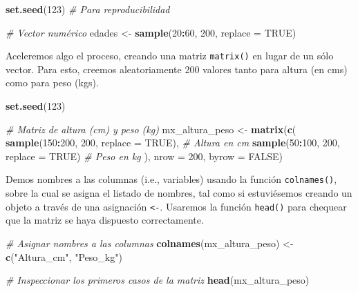 \documentclass[
]{book}
\newenvironment{Shaded}{\begin{snugshade}}{\end{snugshade}}
\newcommand{\AttributeTok}[1]{\textcolor[rgb]{0.13,0.29,0.53}{#1}}
\newcommand{\CommentTok}[1]{\textcolor[rgb]{0.56,0.35,0.01}{\textit{#1}}}
\newcommand{\ConstantTok}[1]{\textcolor[rgb]{0.56,0.35,0.01}{#1}}
\newcommand{\DecValTok}[1]{\textcolor[rgb]{0.00,0.00,0.81}{#1}}
\newcommand{\FunctionTok}[1]{\textcolor[rgb]{0.13,0.29,0.53}{\textbf{#1}}}
\newcommand{\NormalTok}[1]{#1}
\newcommand{\OtherTok}[1]{\textcolor[rgb]{0.56,0.35,0.01}{#1}}
\newcommand{\SpecialCharTok}[1]{\textcolor[rgb]{0.81,0.36,0.00}{\textbf{#1}}}
\newcommand{\StringTok}[1]{\textcolor[rgb]{0.31,0.60,0.02}{#1}}
\begin{document}
\begin{Shaded}
\begin{Highlighting}[]
\FunctionTok{set.seed}\NormalTok{(}\DecValTok{123}\NormalTok{)  }\CommentTok{\# Para reproducibilidad}

\CommentTok{\# Vector numérico}
\NormalTok{edades }\OtherTok{\textless{}{-}} \FunctionTok{sample}\NormalTok{(}\DecValTok{20}\SpecialCharTok{:}\DecValTok{60}\NormalTok{, }\DecValTok{200}\NormalTok{, }\AttributeTok{replace =} \ConstantTok{TRUE}\NormalTok{)}
\end{Highlighting}
\end{Shaded}

Aceleremos algo el proceso, creando una matriz \texttt{matrix()} en lugar de un sólo vector. Para esto, creemos aleatoriamente 200 valores tanto para altura (en cms) como para peso (kgs).

\begin{Shaded}
\begin{Highlighting}[]
\FunctionTok{set.seed}\NormalTok{(}\DecValTok{123}\NormalTok{)}

\CommentTok{\# Matriz de altura (cm) y peso (kg)}
\NormalTok{mx\_altura\_peso }\OtherTok{\textless{}{-}} \FunctionTok{matrix}\NormalTok{(}\FunctionTok{c}\NormalTok{(}
  \FunctionTok{sample}\NormalTok{(}\DecValTok{150}\SpecialCharTok{:}\DecValTok{200}\NormalTok{, }\DecValTok{200}\NormalTok{, }\AttributeTok{replace =} \ConstantTok{TRUE}\NormalTok{),  }\CommentTok{\# Altura en cm}
  \FunctionTok{sample}\NormalTok{(}\DecValTok{50}\SpecialCharTok{:}\DecValTok{100}\NormalTok{, }\DecValTok{200}\NormalTok{, }\AttributeTok{replace =} \ConstantTok{TRUE}\NormalTok{)   }\CommentTok{\# Peso en kg}
\NormalTok{), }\AttributeTok{nrow =} \DecValTok{200}\NormalTok{, }\AttributeTok{byrow =} \ConstantTok{FALSE}\NormalTok{)}
\end{Highlighting}
\end{Shaded}

Demos nombres a las columnas (i.e., variables) usando la función \texttt{colnames()}, sobre la cual se asigna el listado de nombres, tal como si estuviésemos creando un objeto a través de una asignación \texttt{\textless{}-}. Usaremos la función \texttt{head()} para chequear que la matriz se haya dispuesto correctamente.

\begin{Shaded}
\begin{Highlighting}[]
\CommentTok{\# Asignar nombres a las columnas}
\FunctionTok{colnames}\NormalTok{(mx\_altura\_peso) }\OtherTok{\textless{}{-}} \FunctionTok{c}\NormalTok{(}\StringTok{"Altura\_cm"}\NormalTok{, }\StringTok{"Peso\_kg"}\NormalTok{)}

\CommentTok{\# Inspeccionar los primeros casos de la matriz}
\FunctionTok{head}\NormalTok{(mx\_altura\_peso)}
\end{Highlighting}
\end{Shaded}
\end{document}
